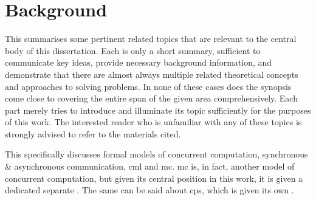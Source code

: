 \chapter{\label{chap:back}Background}
This  summarises some pertinent related topics that are relevant to the central body of this dissertation.  Each is only a short summary, sufficient to communicate key ideas, provide necessary background information, and demonstrate that there are almost always multiple related theoretical concepts and approaches to solving problems.  In none of these cases does the synopsis come close to covering the entire span of the given area comprehensively.  Each part merely tries to introduce and illuminate its topic sufficiently for the purposes of this work.  The interested reader who is unfamiliar with any of these topics is strongly advised to refer to the materials cited.


This  specifically discusses formal models of concurrent computation, synchronous \& asynchronous communication, \gls{cml} and \gls{mc}.  \Gls{mc} is, in fact, another model of concurrent computation, but given its central position in this work, it is given a dedicated separate .  The same can be said about \gls{cps}, which is given its own .




